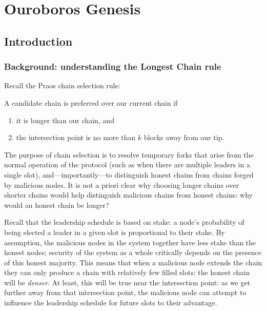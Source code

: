 \newcommand{\RequiredPeers}{\ensuremath{N_\mathit{rs}}}

\chapter{Ouroboros Genesis}
\label{genesis}

\section{Introduction}

\subsection{Background: understanding the Longest Chain rule}
\label{genesis:background:longest-chain}

Recall the Praos chain selection rule:

\begin{definition}
\label{longest-chain-rule}
A candidate chain is preferred over our current chain if
%
\begin{enumerate}
\item it is longer than our chain, and
\item the intersection point is no more than $k$ blocks away from our tip.
\end{enumerate}
\end{definition}

The purpose of chain selection is to resolve temporary forks that arise from the
normal operation of the protocol (such as when there are multiple leaders in a
single slot), and---importantly---to distinguish honest chains from chains
forged by malicious nodes. It is not a priori clear why choosing longer chains
over shorter chains would help distinguish malicious chains from honest chains:
why would an honest chain be longer?

Recall that the leadership schedule is based on stake: a node's probability of
being elected a leader in a given slot is proportional to their stake. By
assumption, the malicious nodes in the system together have less stake than the
honest nodes; security of the system as a whole critically depends on the
presence of this honest majority. This means that when a malicious node extends
the chain they can only produce a chain with relatively few filled slots: the
honest chain will be \emph{denser}. At least, this will be true near the
intersection point: as we get further away from that intersection point, the
malicious node can attempt to influence the leadership schedule for future slots
to their advantage.

